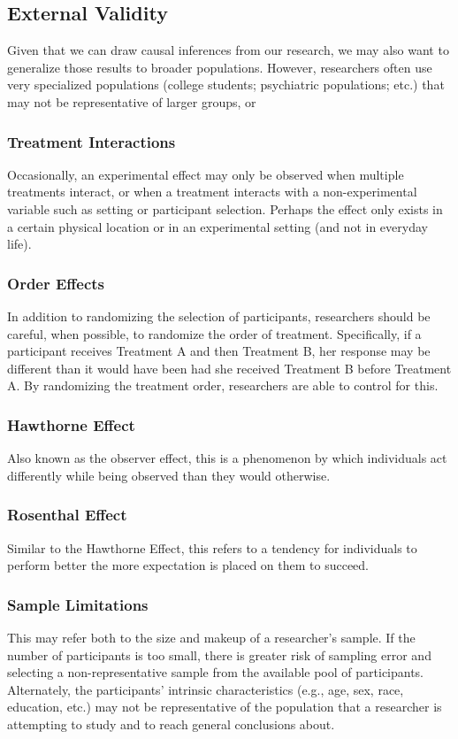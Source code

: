 \subsection{External Validity}

Given that we can draw causal inferences from our research, we may also want to generalize those results to broader populations. However, researchers often use very specialized populations (college students; psychiatric populations; etc.) that may not be representative of larger groups, or 

\subsubsection{Treatment Interactions}
Occasionally, an experimental effect may only be observed when multiple treatments interact, or when a treatment interacts with a non-experimental variable such as setting or participant selection. Perhaps the effect only exists in a certain physical location or in an experimental setting (and not in everyday life).

\subsubsection{Order Effects}
In addition to randomizing the selection of participants, researchers should be careful, when possible, to randomize the order of treatment. Specifically, if a participant receives Treatment A and then Treatment B, her response may be different than it would have been had she received Treatment B before Treatment A. By randomizing the treatment order, researchers are able to control for this.

\subsubsection{Hawthorne Effect}
Also known as the observer effect, this is a phenomenon by which individuals act differently while being observed than they would otherwise.

\subsubsection{Rosenthal Effect}
Similar to the Hawthorne Effect, this refers to a tendency for individuals to perform better the more expectation is placed on them to succeed.

\subsubsection{Sample Limitations}
This may refer both to the size and makeup of a researcher's sample. If the number of participants is too small, there is greater risk of sampling error and selecting a non-representative sample from the available pool of participants. Alternately, the participants' intrinsic characteristics (e.g., age, sex, race, education, etc.) may not be representative of the population that a researcher is attempting to study and to reach general conclusions about.